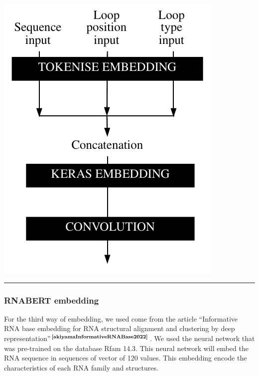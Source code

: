 \documentclass[12pt, oneside, a4paper]{report}
\newcommand{\p}[1]{$^\text{#1}$}
\newcommand{\Cite}[1]{\p{\textbf{\cite{#1}}}}
\begin{document}
\begin{multicols}{2}
\begingroup
\centering
    \includegraphics[width=\columnwidth ]{figure/keras_embedding.pdf}
        
    
    \hrule height 1pt
    

\endgroup

\subsubsection{RNABERT embedding}
For the third way of embedding, we used come from the article ``Informative RNA base embedding for RNA structural alignment and clustering by deep representation''\Cite{akiyamaInformativeRNABase2022}.  We used the neural network that was pre-trained on the database Rfam 14.3. This neural network will embed the RNA sequence in sequences of vector of 120 values. This embedding encode the characteristics of each RNA family and structures. 


\end{multicols}
\end{document}
